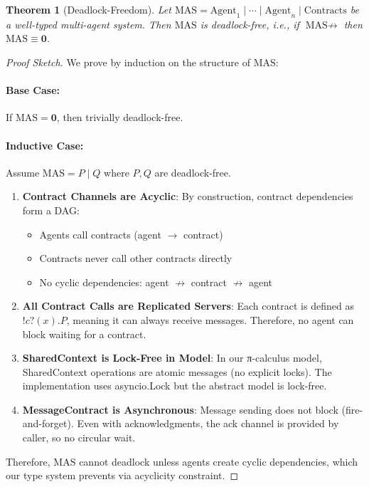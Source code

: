 \documentclass{article}
\newtheorem{theorem}{Theorem}
\begin{document}
\begin{theorem}[Deadlock-Freedom]
Let $\text{MAS} = \text{Agent}_1 \mid \cdots \mid \text{Agent}_n \mid \text{Contracts}$ be a well-typed multi-agent system. Then $\text{MAS}$ is deadlock-free, i.e., if $\text{MAS} \not\to$ then $\text{MAS} \equiv \mathbf{0}$.
\end{theorem}

\begin{proof}[Proof Sketch]
We prove by induction on the structure of $\text{MAS}$:

\paragraph{Base Case:} If $\text{MAS} = \mathbf{0}$, then trivially deadlock-free.

\paragraph{Inductive Case:} Assume $\text{MAS} = P \mid Q$ where $P, Q$ are deadlock-free.

\begin{enumerate}
\item \textbf{Contract Channels are Acyclic}: 
  By construction, contract dependencies form a DAG:
  \begin{itemize}
  \item Agents call contracts (agent $\to$ contract)
  \item Contracts never call other contracts directly
  \item No cyclic dependencies: agent $\not\to$ contract $\not\to$ agent
  \end{itemize}

\item \textbf{All Contract Calls are Replicated Servers}:
  Each contract is defined as $!c?(x).P$, meaning it can always receive messages. Therefore, no agent can block waiting for a contract.

\item \textbf{SharedContext is Lock-Free in Model}:
  In our π-calculus model, SharedContext operations are atomic messages (no explicit locks). The implementation uses asyncio.Lock but the abstract model is lock-free.

\item \textbf{MessageContract is Asynchronous}:
  Message sending does not block (fire-and-forget). Even with acknowledgments, the ack channel is provided by caller, so no circular wait.
\end{enumerate}

Therefore, $\text{MAS}$ cannot deadlock unless agents create cyclic dependencies, which our type system prevents via acyclicity constraint.
\end{proof}
\end{document}

